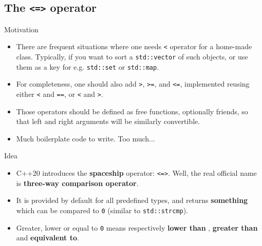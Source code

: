 \subsection[spaceship]{The \texttt{<=>} operator}

\begin{frame}[fragile]
  \begin{block}{Motivation}
    \begin{itemize}
    \item There are frequent situations where one needs \texttt{<} operator for a home-made class. Typically, if you want to sort a \texttt{std::vector} of such objects, or use them as a key for e.g. \texttt{std::set} or \texttt{std::map}.
    \item For completeness, one should also add \texttt{>}, \texttt{>=}, and \texttt{<=}, implemented reusing either \texttt{<} and \texttt{==}, or \texttt{<} and \texttt{>}.
    \item Those operators should be defined as free functions, optionally friends, so that left and right arguments will be similarly convertible.
    \item Much boilerplate code to write. Too much...
    \end{itemize}
  \end{block}
\end{frame}

\begin{frame}[fragile]
  \begin{block}{Idea}
    \begin{itemize}
    \item C++20 introduces the \textbf{spaceship} operator: \texttt{<=>}. Well, the real official name is \textbf{three-way comparison operator}.
    \item It is provided by default for all predefined types, and returns \textbf{something} which can be compared to \texttt{0} (similar to \texttt{std::strcmp}).
    \item Greater, lower or equal to \texttt{0} means respectively \textbf{lower than} , \textbf{greater than} and \textbf{equivalent to}.
    \end{itemize}
  \end{block}
\end{frame}

